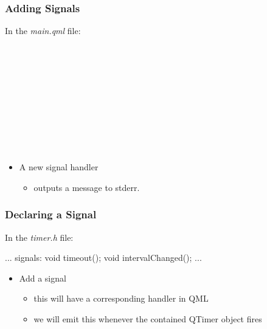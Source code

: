 
\begin{slide}[fragile]\frametitle{Adding Signals}

In the \textit{main.qml} file:

\begin{qml}
\vspace*{0.5em}
\\
\\
\vspace*{0.5em}
\\
\\
\vspace*{0.5em}
\\
\\
\qtt{~~~~~~~~\}}\\
\qtt{~~~~\}}\\
\qtt{\}}\\
\end{qml}

\begin{itemize}
\item A new  signal handler
  \begin{itemize}
  \item outputs a message to stderr.
  \end{itemize}
\end{itemize}

\end{slide}



\begin{slide}[fragile]\frametitle{Declaring a Signal}

In the \textit{timer.h} file:

\vspace*{0.5em}
\begin{cpp}
...
signals:
    void timeout();
    void intervalChanged();
...
\end{cpp}

\begin{itemize}
\item Add a  signal
  \begin{itemize}
  \item this will have a corresponding  handler in QML
  \item we will emit this whenever the contained QTimer object fires
  \end{itemize}
\end{itemize}

\end{slide}


